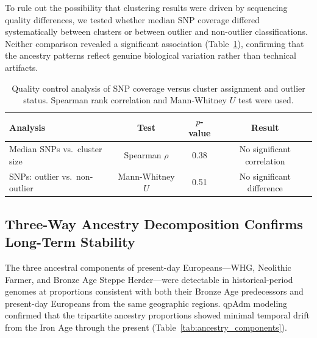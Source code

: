 \documentclass[11pt]{article}
\begin{document}
To rule out the possibility that clustering results were driven by sequencing quality differences, we tested whether median SNP coverage differed systematically between clusters or between outlier and non-outlier classifications. Neither comparison revealed a significant association (Table~\ref{tab:snp_qc}), confirming that the ancestry patterns reflect genuine biological variation rather than technical artifacts.

\begin{table}[H]
\centering
\caption{Quality control analysis of SNP coverage versus cluster assignment and outlier status. Spearman rank correlation and Mann-Whitney $U$ test were used.}
\label{tab:snp_qc}
\begin{tabular}{lccc}
\toprule
\textbf{Analysis} & \textbf{Test} & \textbf{$p$-value} & \textbf{Result} \\
\midrule
Median SNPs vs.\ cluster size & Spearman $\rho$ & 0.38 & No significant correlation \\
SNPs: outlier vs.\ non-outlier & Mann-Whitney $U$ & 0.51 & No significant difference \\
\bottomrule
\end{tabular}
\end{table}

\subsection{Three-Way Ancestry Decomposition Confirms Long-Term Stability}

The three ancestral components of present-day Europeans---WHG, Neolithic Farmer, and Bronze Age Steppe Herder---were detectable in historical-period genomes at proportions consistent with both their Bronze Age predecessors and present-day Europeans from the same geographic regions. qpAdm modeling confirmed that the tripartite ancestry proportions showed minimal temporal drift from the Iron Age through the present (Table~\ref{tab:ancestry_components}).
\end{document}
